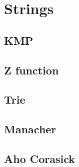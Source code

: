\section{Strings}

\subsection{KMP}


\subsection{Z function}


\subsection{Trie}


\subsection{Manacher}


\subsection{Aho Corasick}

